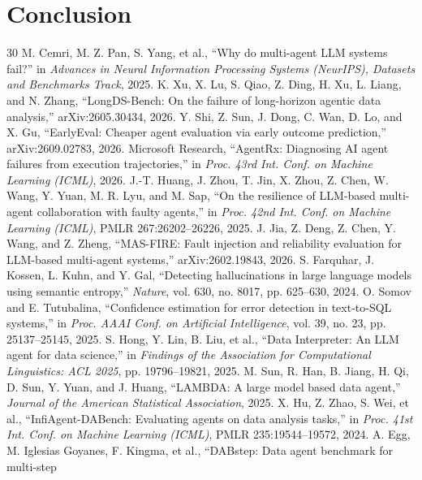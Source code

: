 \documentclass[10pt,twocolumn]{article}
\begin{document}
\section{Conclusion}
\FConclusion

\begingroup
\small
\setlength{\itemsep}{0pt}
\begin{thebibliography}{30}
 M. Cemri, M. Z. Pan, S. Yang, et al., ``Why do multi-agent LLM systems fail?'' in \emph{Advances in
  Neural Information Processing Systems (NeurIPS), Datasets and Benchmarks Track}, 2025.
 K. Xu, X. Lu, S. Qiao, Z. Ding, H. Xu, L. Liang, and N. Zhang, ``LongDS-Bench: On the failure of
  long-horizon agentic data analysis,'' arXiv:2605.30434, 2026.
 Y. Shi, Z. Sun, J. Dong, C. Wan, D. Lo, and X. Gu, ``EarlyEval: Cheaper agent evaluation via
  early outcome prediction,'' arXiv:2609.02783, 2026.
 Microsoft Research, ``AgentRx: Diagnosing AI agent failures from execution trajectories,'' in
  \emph{Proc. 43rd Int. Conf. on Machine Learning (ICML)}, 2026.
 J.-T. Huang, J. Zhou, T. Jin, X. Zhou, Z. Chen, W. Wang, Y. Yuan, M. R. Lyu, and M. Sap, ``On the
  resilience of LLM-based multi-agent collaboration with faulty agents,'' in \emph{Proc. 42nd Int. Conf. on Machine
  Learning (ICML)}, PMLR 267:26202--26226, 2025.
 J. Jia, Z. Deng, Z. Chen, Y. Wang, and Z. Zheng, ``MAS-FIRE: Fault injection and reliability
  evaluation for LLM-based multi-agent systems,'' arXiv:2602.19843, 2026.
 S. Farquhar, J. Kossen, L. Kuhn, and Y. Gal, ``Detecting hallucinations in large language models
  using semantic entropy,'' \emph{Nature}, vol. 630, no. 8017, pp. 625--630, 2024.
 O. Somov and E. Tutubalina, ``Confidence estimation for error detection in text-to-SQL systems,'' in
  \emph{Proc. AAAI Conf. on Artificial Intelligence}, vol. 39, no. 23, pp. 25137--25145, 2025.
 S. Hong, Y. Lin, B. Liu, et al., ``Data Interpreter: An LLM agent for data science,'' in
  \emph{Findings of the Association for Computational Linguistics: ACL 2025}, pp. 19796--19821, 2025.
 M. Sun, R. Han, B. Jiang, H. Qi, D. Sun, Y. Yuan, and J. Huang, ``LAMBDA: A large model based data
  agent,'' \emph{Journal of the American Statistical Association}, 2025.
 X. Hu, Z. Zhao, S. Wei, et al., ``InfiAgent-DABench: Evaluating agents on data analysis tasks,''
  in \emph{Proc. 41st Int. Conf. on Machine Learning (ICML)}, PMLR 235:19544--19572, 2024.
 A. Egg, M. Iglesias Goyanes, F. Kingma, et al., ``DABstep: Data agent benchmark for multi-step

\end{thebibliography}
\end{document}
